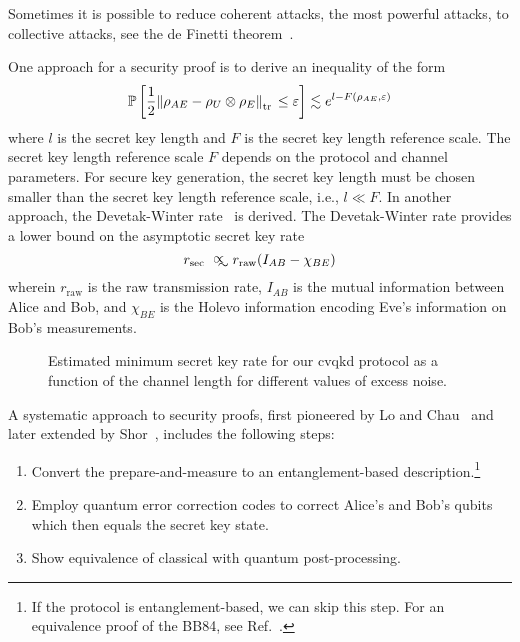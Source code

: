 Sometimes it is possible to reduce coherent attacks, the most powerful attacks, to collective attacks, see the de Finetti theorem~\cite[p.~148]{Wolf2021}.

One approach for a security proof is to derive an inequality of the form~\cite[p.~11]{Scarani2009}
\begin{equation}
	\mathbb{P}\left[
		\frac{1}{2}
		\norm{\rho_{AE}-\rho_U\otimes\rho_E}_{\trace{}}
		\leq
		\varepsilon
	\right]
	\lesssim
	e^{l-F(\rho_{AE},\varepsilon)}
	\label{eq:qkd_inequality}
\end{equation}
where $l$ is the secret key length and $F$ is the secret key length reference scale.
The secret key length reference scale $F$ depends on the protocol and channel parameters.
For secure key generation, the secret key length must be chosen smaller than the secret key length reference scale, i.e., $l\ll F$.
In another approach, the Devetak-Winter rate~\cite[p.~144]{Wolf2021} is derived.
The Devetak-Winter rate provides a lower bound on the asymptotic secret key rate
\begin{equation}
	r_\text{sec}
	\approxprop
	r_\text{raw}
	(I_{AB}-\chi_{BE})
\end{equation}
wherein $r_\text{raw}$ is the raw transmission rate, $I_{AB}$ is the mutual information between Alice and Bob, and $\chi_{BE}$ is the Holevo information encoding Eve's information on Bob's measurements.
\begin{figure}[htb]
	\centering
	
	\caption{Estimated minimum secret key rate for our \gls{cvqkd} protocol as a function of the channel length for different values of excess noise.}\label{fig:cvsim}
\end{figure}

A systematic approach to security proofs, first pioneered by Lo and Chau~\cite{Lo1999} and later extended by Shor~\cite{Shor2000}, includes the following steps:
\begin{enumerate}
	\item Convert the prepare-and-measure to an entanglement-based description.\footnote{If the protocol is entanglement-based, we can skip this step. For an equivalence proof of the BB84, see Ref.~\cite[p.~106]{Wolf2021}.}
	\item Employ quantum error correction codes to correct Alice's and Bob's qubits which then equals the secret key state.
	\item Show equivalence of classical with quantum post-processing.
\end{enumerate}